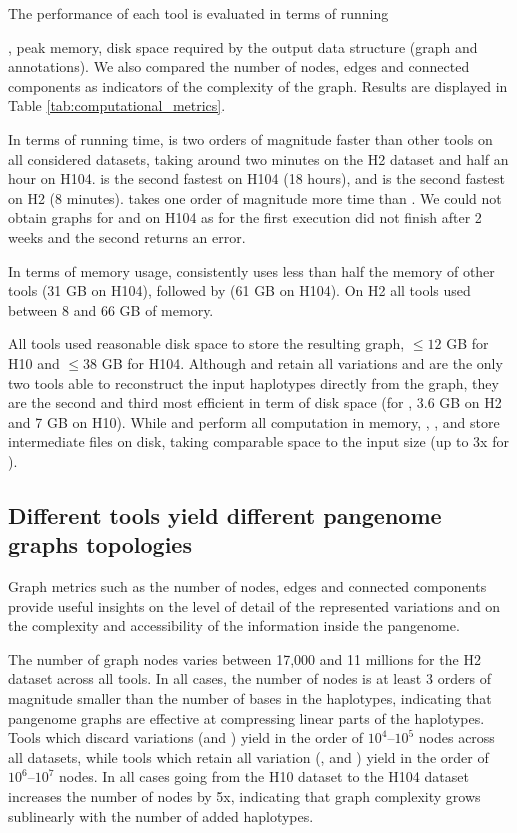 The performance of each tool is evaluated in terms of running 

, peak memory, disk space required by the output data structure (graph and annotations). We also compared the number of nodes, edges and connected components as indicators of the complexity of the graph. Results are displayed in Table \ref{tab:computational_metrics}. 

In terms of running time, \mdbg is two orders of magnitude faster than other tools on all considered datasets, taking around two minutes on the H2 dataset and half an hour on H104.
\bifrost is the second fastest on H104 (18 hours), and \minigraph is the second fastest on H2 (8 minutes). \mcactus takes one order of magnitude more time than \minigraph. We could not obtain graphs for \pggb and \mcactus on H104 as for the first execution did not finish after 2 weeks and the second returns an error. 

In terms of memory usage, \mdbg consistently uses less than half the memory of other tools (31 GB on H104), followed by \minigraph (61 GB on H104). On H2 all tools used between 8 and 66 GB of memory.

All tools used reasonable disk space to store the resulting graph, $\leq 12$ GB for H10 and $\leq 38$ GB for H104. Although \mcactus and \pggb retain all variations and are the only two tools able to reconstruct the input haplotypes directly from the graph, they are the second and third most efficient in term of disk space (for \mcactus, 3.6 GB on H2 and 7 GB on H10). 
While \bifrost and \minigraph perform all computation in memory, \pggb, \mcactus, and \mdbg store intermediate files on disk, taking comparable space to the input size (up to 3x for \mcactus).  \\

\subsection*{\textbf{Different tools yield different pangenome graphs topologies}}
Graph metrics such as the number of nodes, edges and connected components provide useful insights on the level of detail of the represented variations and on the complexity and accessibility of the information inside the pangenome.

The number of graph nodes varies between 17,000 and 11 millions for the H2 dataset across all tools. In all cases, the number of nodes is at least 3 orders of magnitude smaller than the number of bases in the haplotypes, indicating that pangenome graphs are effective at compressing linear parts of the haplotypes.
Tools which discard variations (\minigraph and \mdbg) yield in the order of $10^4$--$10^5$ nodes across all datasets, while tools which retain all variation (\bifrost, \mcactus and \pggb) yield in the order of $10^6$--$10^7$ nodes. In all cases going from the H10 dataset to the H104 dataset increases the number of nodes by 5x, indicating that graph complexity grows sublinearly with the number of added haplotypes.

